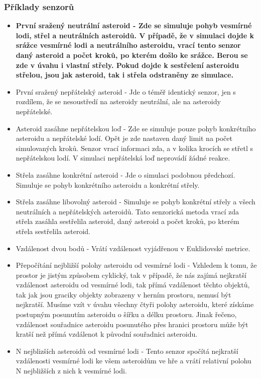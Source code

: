 \subsubsection{Příklady senzorů}
\begin{itemize}
    \item \bf{První sražený neutrální asteroid} - Zde se simuluje pohyb vesmírné lodi, střel a neutrálních asteroidů. 
    V případě, že v simulaci dojde k srážce vesmírné lodi a neutrálního asteroidu, vrací tento senzor daný asteroid a počet kroků, po kterém došlo ke srážce.
    Berou se zde v úvahu i vlastní střely. Pokud dojde k sestřelení asteroidu střelou, jsou jak asteroid, tak i střela odstraněny ze simulace.
    \item První sražený nepřátelský asteroid - Jde o téměř identický senzor, jen s rozdílem, že se nesoustředí na asteroidy neutrální, ale na asteroidy nepřátelské.
    \item Asteroid zasáhne nepřátelskou loď - Zde se simuluje pouze pohyb konkrétního asteroidu a nepřátelské lodí. 
    Opět je zde nastaven daný limit na počet simulovaných kroků. 
    Senzor vrací informaci zda, a v kolika krocích se střetl s nepřátelskou lodí.
    V simulaci nepřátelská loď neprovádí žádné reakce.
    \item Střela zasáhne konkrétní asteroid - Jde o simulaci podobnou předchozí. Simuluje se pohyb konkrétního asteroidu a konkrétní střely.
    \item Střela zasáhne libovolný asteroid - Simuluje se pohyb konkrétní střely a všech neutrálních a nepřátelských asteroidů.
        Tato senzorická metoda vrací zda střela zasáhla sestřelila asteroid, daný asteroid a počet kroků, po kterém střela sestřelila asteroid.
    \item Vzdálenost dvou bodů - Vrátí vzdálenost vyjádřenou v Euklidovské metrice.
    \item Přepočítání nejbližší polohy asteroidu od vesmírné lodi - Vzhledem k tomu, že prostor je jistým způsobem cyklický, tak v případě, že nás zajímá nejkratší vzdálenost asteroidu od vesmírné lodi, tak přímá vzdálenost těchto objektů, tak jak jsou graciky objekty zobrazeny v herním prostoru, nemusí být nejkratší.
        Musíme vzít v úvahu všechny čtyři polohy asteroidu, které získáme postupným posunutím asteroidu o šířku a délku prostoru.
        Jinak řečeno, vzdálenost souřadnice asteroidu posunutého přes hranici prostoru může být kratší než přímá vzdálenot k původní souřadnici asteroidu.
    \item N nejblizších asteroidů od vesmírné lodi - Tento senzor spočítá nejkratší vzdálenosti vesmírné lodi ke všem asteroidům ve hře a vrátí relativní polohu N nejbližších z nich k vesmírné lodi.
    
\end{itemize}


